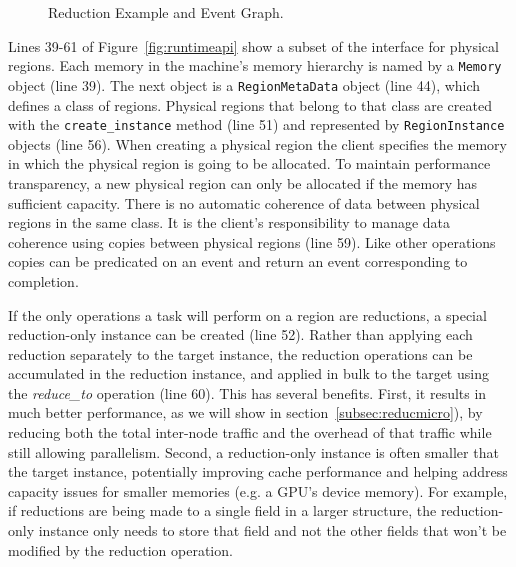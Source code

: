 \begin{figure}
{{
}
}
  \caption{Reduction Example and Event Graph.\label{fig:reducevents}}
  \vspace{-4mm}
\end{figure}

Lines 39-61 of Figure~\ref{fig:runtimeapi} show a subset of the interface for physical regions.  
Each memory in the machine's memory hierarchy is named by a {\tt Memory} object (line 39).
The next object is a {\tt RegionMetaData} object (line 44), which defines a class of
regions.  Physical regions that belong to that class are created with the {\tt create\_instance}
method (line 51) and represented by {\tt RegionInstance} objects (line 56).  When creating a physical
region the client specifies the memory in which the physical region is going
to be allocated.  To maintain performance transparency, a new physical region can only be allocated
if the memory has sufficient capacity.
There is no automatic coherence of data between physical regions in the
same class.  It is the client's responsibility to manage data coherence using copies
between physical regions (line 59).  Like other operations copies can be
predicated on an event and return an event corresponding to completion.

If the only operations a task will perform on a region are reductions, a special reduction-only
instance can be created (line 52).  Rather than applying each reduction separately to the target instance,
the reduction operations can be accumulated in the reduction instance, and applied in bulk to 
the target using the {\em reduce\_to} operation (line 60).  This has several benefits.  First, it results
in much better performance, as we will show in section~\ref{subsec:reducmicro}), by reducing both
the total inter-node traffic and the overhead of that traffic while still allowing parallelism.
Second, a reduction-only instance is often smaller that the target instance, potentially improving
cache performance and helping address capacity issues for smaller memories (e.g. a GPU's device
memory).  For example, if reductions are being made to a single field in a larger structure, the 
reduction-only instance only needs to store that field and not the other fields that won't be 
modified by the reduction operation.

